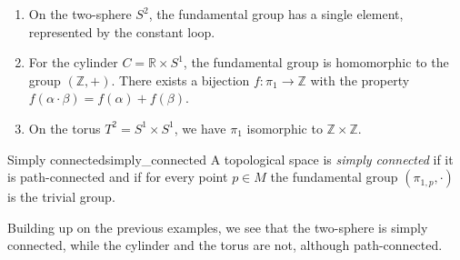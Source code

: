 \begin{example}
    \begin{enumerate}[label=(\alph*)]
        \item On the two-sphere \(S^2\), the fundamental group has a single element, represented by the constant loop.
        \item For the cylinder \(C = \mathbb{R}\times S^1\), the fundamental group is homomorphic to the group \((\mathbb{Z}, +)\). There exists a bijection \(f : \pi_1 \to \mathbb{Z}\) with the property \(f(\alpha\cdot\beta) = f(\alpha) + f(\beta)\).
        \item On the torus \(T^2 = S^1 \times S^1\), we have \(\pi_1\) isomorphic to \(\mathbb{Z}\times\mathbb{Z}\).
    \end{enumerate}
\end{example}

\begin{definition}{Simply connected}{simply_connected}
    A topological space  is \emph{simply connected} if it is path-connected and if for every point \(p \in M\) the fundamental group \((\pi_{1,p}, \cdot)\) is the trivial group.
\end{definition}
\begin{remark}
    Building up on the previous examples, we see that the two-sphere is simply connected, while the cylinder and the torus are not, although path-connected.
\end{remark}
